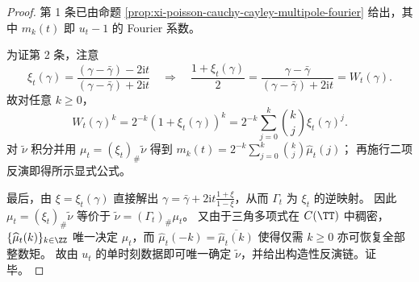 \begin{proof}
第 1 条已由命题 \ref{prop:xi-poisson-cauchy-cayley-multipole-fourier} 给出，其中 \(m_k(t)\) 即 \(u_t-1\) 的 Fourier 系数。
\par
为证第 2 条，注意
\[
\xi_t(\gamma)=\frac{(\gamma-\bar\gamma)-2\mathrm{i}t}{(\gamma-\bar\gamma)+2\mathrm{i}t}
\quad\Longrightarrow\quad
\frac{1+\xi_t(\gamma)}{2}=\frac{\gamma-\bar\gamma}{(\gamma-\bar\gamma)+2\mathrm{i}t}=W_t(\gamma).
\]
故对任意 \(k\ge0\)，
\[
W_t(\gamma)^k=2^{-k}(1+\xi_t(\gamma))^k
=2^{-k}\sum_{j=0}^{k}\binom{k}{j}\xi_t(\gamma)^j.
\]
对 \(\tilde\nu\) 积分并用 \(\mu_t=(\xi_t)_\#\tilde\nu\) 得到
\(
m_k(t)=2^{-k}\sum_{j=0}^{k}\binom{k}{j}\widehat\mu_t(j)
\)；
再施行二项反演即得所示显式公式。
\par
最后，由 \(\xi=\xi_t(\gamma)\) 直接解出
\(
\gamma=\bar\gamma+2\mathrm{i}t\frac{1+\xi}{1-\xi}
\)，从而 \(\Gamma_t\) 为 \(\xi_t\) 的逆映射。
因此 \(\mu_t=(\xi_t)_\#\tilde\nu\) 等价于 \(\tilde\nu=(\Gamma_t)_\#\mu_t\)。
又由于三角多项式在 \(C(\TT)\) 中稠密，\(\{\widehat\mu_t(k)\}_{k\in\ZZ}\) 唯一决定 \(\mu_t\)，而 \(\widehat\mu_t(-k)=\overline{\widehat\mu_t(k)}\) 使得仅需 \(k\ge0\) 亦可恢复全部整数矩。
故由 \(u_t\) 的单时刻数据即可唯一确定 \(\tilde\nu\)，并给出构造性反演链。证毕。
\end{proof}

